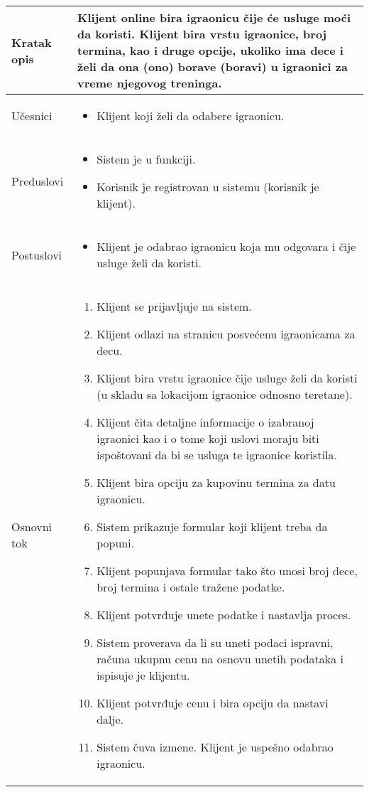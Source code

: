 \documentclass[../../main.tex]{subfiles}
\begin{document}
\begin{longtable}{| p{} | p{} |} 
\hline
    Kratak opis & Klijent online bira igraonicu čije će usluge moći da koristi. Klijent bira vrstu igraonice, broj termina, kao i druge opcije, ukoliko ima dece i želi da ona (ono) borave (boravi) u igraonici za vreme njegovog treninga. \\ 
\hline    
    Učesnici &
    \begin{itemize}
        \item Klijent koji želi da 
 odabere igraonicu.
    \end{itemize}\\
\hline
   Preduslovi &
   \begin{itemize}
        \item Sistem je u funkciji.
        \item Korisnik je registrovan u sistemu (korisnik je klijent).
    \end{itemize}\\
\hline  
    Postuslovi & 
    \begin{itemize}
        \item Klijent je odabrao igraonicu koja mu odgovara i čije usluge želi da koristi.
    \end{itemize} \\
\hline
    Osnovni tok & 
    \begin{enumerate}
        \item Klijent se prijavljuje na sistem.
        \item Klijent odlazi na stranicu posvećenu igraonicama za decu.
        \item Klijent bira vrstu igraonice čije usluge želi da koristi (u skladu sa lokacijom igraonice odnosno teretane).
        \item Klijent čita detaljne informacije o izabranoj igraonici kao i o tome koji uslovi moraju biti ispoštovani da bi se usluga te igraonice koristila.
        \item Klijent bira opciju za kupovinu termina za datu igraonicu.
        \item Sistem prikazuje formular koji klijent treba da popuni.
        \item Klijent popunjava formular tako što unosi broj dece, broj termina i ostale tražene podatke.
        \item Klijent potvrđuje unete podatke i nastavlja proces.
        \item Sistem proverava da li su uneti podaci ispravni, računa ukupnu cenu na osnovu unetih podataka i ispisuje je klijentu.
        \item Klijent potvrđuje cenu i bira opciju da nastavi dalje. 
        \item Sistem čuva izmene. Klijent je uspešno odabrao igraonicu. %
        

\end{enumerate}
\end{longtable}
\end{document}

